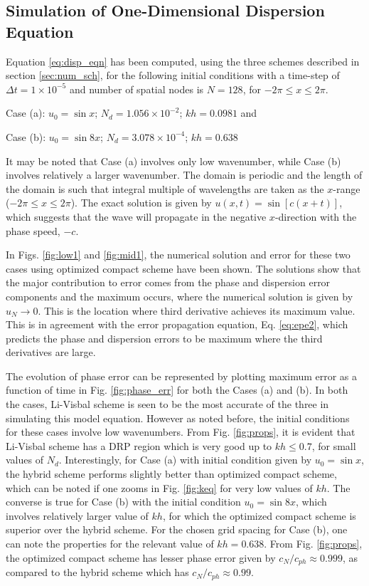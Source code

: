 \subsection{Simulation of One-Dimensional Dispersion Equation}
Equation \eqref{eq:disp_eqn} has been computed, using the three schemes described in section \ref{sec:num_sch}, for the following initial conditions with 
a time-step of $\Delta t =1 \times 10^{-5}$ and number of spatial nodes is $N=128$, for $-2\pi \leq x \leq 2\pi$.

Case (a): $u_0 = \sin x$; $N_d=1.056 \times 10^{-2}$; $kh=0.0981$\;\; and 

Case (b): $u_0 = \sin 8x$; $N_d=3.078 \times 10^{-4}$; $kh=0.638$



It may be noted that Case (a) involves only low wavenumber, while Case (b) involves relatively a larger wavenumber. The domain is periodic 
and the length of the domain is such that integral multiple of wavelengths are taken as the $x$-range ($-2\pi \leq x \leq 2\pi$). The exact solution 
is given by $u(x,t)=\sin[c(x+t)]$, which suggests that the wave will propagate in the negative $x$-direction with the phase speed, $-c$. 

In Figs. \ref{fig:low1} and \ref{fig:mid1}, the numerical solution and error for these two cases using optimized compact scheme have been shown. The solutions show that the major contribution to error comes from the phase and dispersion error components and the maximum occurs, where the numerical solution is given by $u_N \to 0$. This is the location where third derivative achieves its maximum value. This is in agreement with the error 
propagation equation, Eq. \eqref{eq:epe2}, which predicts the phase and dispersion errors to be maximum where the third derivatives are large.

The evolution of phase error can be represented by plotting maximum error as a function of time in Fig. \ref{fig:phase_err} for both the Cases (a) and
(b). In both the cases, Li-Visbal scheme is seen to be the most accurate of the three in simulating this model equation. However as noted before, the initial conditions for these cases involve low wavenumbers. From Fig. \ref{fig:props}, it is evident that Li-Visbal scheme has a DRP region which is 
very good up to $kh \leq 0.7$, for small values of $N_d$. Interestingly, for Case (a) with initial condition given by $u_0 = \sin x$, the hybrid scheme performs slightly better than optimized compact scheme, which can be noted if one zooms in Fig. \ref{fig:keq} for very low values of $kh$. The converse 
is true for Case (b) with the initial condition $u_0 = \sin 8x$, which involves relatively larger value of $kh$, for which the optimized compact scheme 
is superior over the hybrid scheme. For the chosen grid spacing for Case (b), one can note the properties for the relevant value of $kh=0.638$. From 
Fig. \ref{fig:props}, the optimized compact scheme has lesser phase error given by $c_N/c_{ph} \approx 0.999$, as compared to the hybrid scheme which 
has $c_N/c_{ph} \approx 0.99$.

